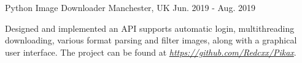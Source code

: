 \begin{cventries}
  \cventry
    {Python} %
    {Image Downloader} %
    {Manchester, UK} %
    {Jun. 2019 - Aug. 2019} %
    {
      \begin{cvitems} %
        \item {Designed and implemented an API supports automatic login, multithreading downloading, various format parsing and filter images, along with a graphical user interface. The project can be found at \href{https://github.com/Redcxx/Pikax}{\textit{https://github.com/Redcxx/Pikax}}.}
      \end{cvitems}
    }
  
    






\end{cventries}
